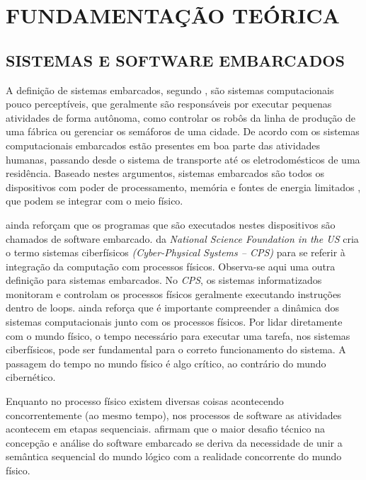 \chapter{FUNDAMENTAÇÃO TEÓRICA}\label{CAP4}

\section{SISTEMAS E SOFTWARE EMBARCADOS}\label{secaosistemasembarcados}
A definição de sistemas embarcados, segundo , são sistemas computacionais pouco perceptíveis, que geralmente são responsáveis por executar pequenas atividades de forma autônoma, como controlar os robôs da linha de produção de uma fábrica ou gerenciar os semáforos de uma cidade. De acordo com  os sistemas computacionais embarcados estão presentes em boa parte das atividades humanas, passando desde o sistema de transporte até os eletrodomésticos de uma residência. Baseado nestes argumentos, sistemas embarcados são todos os dispositivos com poder de processamento, memória e fontes de energia limitados \cite{leeseshia}, que podem se integrar com o meio físico.

 ainda reforçam que os programas que são executados nestes dispositivos são chamados de software embarcado.  da \textit{National Science Foundation in the US} cria o termo sistemas ciberfísicos \textit{(Cyber-Physical Systems – CPS)} para se referir à integração da computação com processos físicos. Observa-se aqui uma outra definição para sistemas embarcados. No \textit{CPS}, os sistemas informatizados monitoram e controlam os processos físicos geralmente executando instruções dentro de loops.  ainda reforça que é importante compreender a dinâmica dos sistemas computacionais junto com os processos físicos. Por lidar diretamente com o mundo físico, o tempo necessário para executar uma tarefa, nos sistemas ciberfísicos, pode ser fundamental para o correto funcionamento do sistema. A passagem do tempo no mundo físico é algo crítico, ao contrário do mundo cibernético.

Enquanto no processo físico existem diversas coisas acontecendo concorrentemente (ao mesmo tempo), nos processos de software as atividades acontecem em etapas sequenciais.  afirmam que o maior desafio técnico na concepção e análise do software embarcado se deriva da necessidade de unir a semântica sequencial do mundo lógico com a realidade concorrente do mundo físico.

